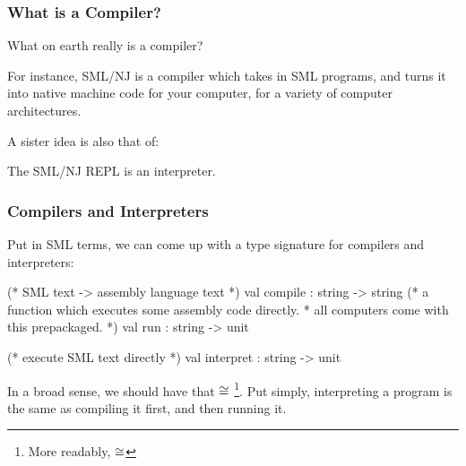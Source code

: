 \documentclass[aspectratio=169]{beamer}
\begin{document}
\begin{frame}[fragile]
  \frametitle{What is a Compiler?}

  What on earth really is a compiler?

  \pause
  \vspace{\fill}


  \pause
  \vspace{\fill}

  For instance, SML/NJ is a compiler which takes in SML programs, and turns it into
  native machine code for your computer, for a variety of computer architectures.

  \pause
  \vspace{\fill}

  A sister idea is also that of:

  \pause
  \vspace{\fill}

  The SML/NJ REPL is an interpreter.
\end{frame}

\begin{frame}[fragile]
  \frametitle{Compilers and Interpreters}

  \tgs

  Put in SML terms, we can come up with a type signature for compilers and
  interpreters:
  \pause
  \begin{codeblock}
    (* SML text -> assembly language text *)
    val compile : string -> string
    (* a function which executes some assembly code directly.
     * all computers come with this prepackaged. *)
    val run : string -> unit

    (* execute SML text directly *)
    val interpret : string -> unit
  \end{codeblock}

  \pause
  \vspace{\fill}

  In a broad sense, we should have that  $\cong$ \footnote{
    More readably,  $\cong$ 
  }.
  Put simply, interpreting a program is the same as compiling it first, and then
  running it.
\end{frame}
\end{document}
